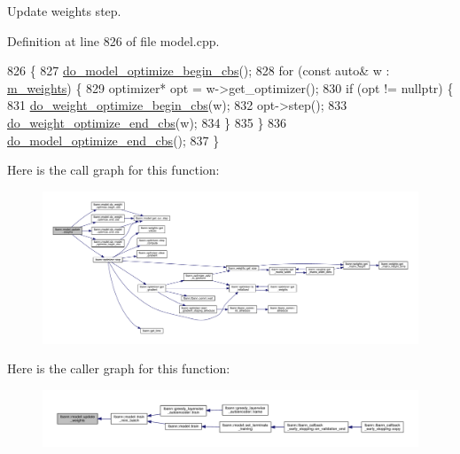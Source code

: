 Update weights step. 

Definition at line 826 of file model.\+cpp.


\begin{DoxyCode}
826                            \{
827   \hyperlink{classlbann_1_1model_a19c96544ccf733646f3454be887f3a08}{do\_model\_optimize\_begin\_cbs}();
828   \textcolor{keywordflow}{for} (\textcolor{keyword}{const} \textcolor{keyword}{auto}& w : \hyperlink{classlbann_1_1model_aaf9adefe4497d90bf5bc2567e71bfb00}{m\_weights}) \{
829     optimizer* opt = w->get\_optimizer();
830     \textcolor{keywordflow}{if} (opt != \textcolor{keyword}{nullptr}) \{
831       \hyperlink{classlbann_1_1model_a24b668fa62ce0215d3b1773636b7eced}{do\_weight\_optimize\_begin\_cbs}(w);
832       opt->step();
833       \hyperlink{classlbann_1_1model_af1e22d2b06d0ca90ae79fd5cf1d82066}{do\_weight\_optimize\_end\_cbs}(w);
834     \}
835   \}
836   \hyperlink{classlbann_1_1model_ac0b37e4f4881e274bd9c4889d4852fe8}{do\_model\_optimize\_end\_cbs}();
837 \}
\end{DoxyCode}
Here is the call graph for this function\+:\nopagebreak
\begin{figure}[H]
\begin{center}
\leavevmode
\includegraphics[width=350pt]{classlbann_1_1model_a38d8924938fa69857d3f9ed83ac98ee9_cgraph}
\end{center}
\end{figure}
Here is the caller graph for this function\+:\nopagebreak
\begin{figure}[H]
\begin{center}
\leavevmode
\includegraphics[width=350pt]{classlbann_1_1model_a38d8924938fa69857d3f9ed83ac98ee9_icgraph}
\end{center}
\end{figure}
\mbox{\label{classlbann_1_1model_a488da86420421a4890c8fd7a95849acc}} 
